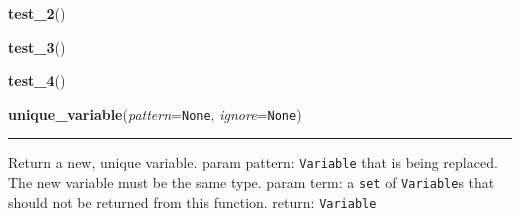     \vspace{0.5ex}

\hspace{.8\funcindent}\begin{boxedminipage}{\funcwidth}

    \raggedright \textbf{test\_2}()

\setlength{\parskip}{2ex}
\setlength{\parskip}{1ex}
    \end{boxedminipage}

    \label{temporaldrt:test_3}

    \vspace{0.5ex}

\hspace{.8\funcindent}\begin{boxedminipage}{\funcwidth}

    \raggedright \textbf{test\_3}()

\setlength{\parskip}{2ex}
\setlength{\parskip}{1ex}
    \end{boxedminipage}

    \label{temporaldrt:test_4}

    \vspace{0.5ex}

\hspace{.8\funcindent}\begin{boxedminipage}{\funcwidth}

    \raggedright \textbf{test\_4}()

\setlength{\parskip}{2ex}
\setlength{\parskip}{1ex}
    \end{boxedminipage}

    \label{temporaldrt:unique_variable}

    \vspace{0.5ex}

\hspace{.8\funcindent}\begin{boxedminipage}{\funcwidth}

    \raggedright \textbf{unique\_variable}(\textit{pattern}={\tt None}, \textit{ignore}={\tt None})

    \vspace{-1.5ex}

    \rule{\textwidth}{0.5\fboxrule}
\setlength{\parskip}{2ex}
    Return a new, unique variable. param pattern: \texttt{Variable} that is
    being replaced.  The new variable must be the same type. param term: a 
    \texttt{set} of \texttt{Variable}s that should not be returned from 
    this function. return: \texttt{Variable}

\setlength{\parskip}{1ex}
    \end{boxedminipage}


